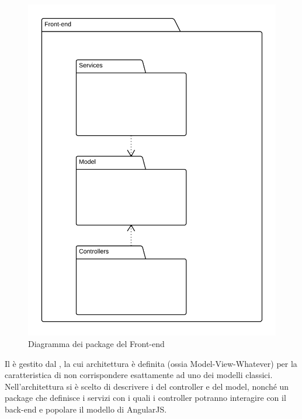 \begin{figure}[H]
\centering
\includegraphics[width=\textwidth]{uml/Front-end-Diagramma dei packages.png}
\caption{Diagramma dei package del Front-end}
\end{figure}

Il  è gestito dal  , la cui architettura è definita  (ossia Model-View-Whatever) per la caratteristica di non corrispondere esattamente ad uno dei modelli classici. Nell'architettura si è scelto di descrivere i  del controller e del model, nonché un package che definisce i servizi con i quali i controller potranno interagire con il back-end e popolare il modello di AngularJS.
